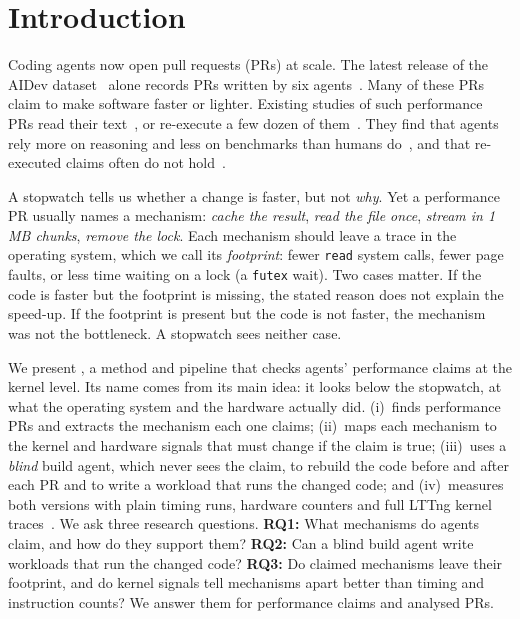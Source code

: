 \section{Introduction}
\label{sec:intro}

Coding agents now open pull requests (PRs) at scale. The latest release of
the AIDev dataset~\cite{li2026aidev} alone records \nAllPRs PRs written by
six agents~\cite{aidev2026v5}. Many of these PRs claim to make software
faster or lighter. Existing studies of such performance PRs read their
text~\cite{opu2025bertopic,peng2025optimization,
dovhoshliubnyi2026mutation,peng2026validation}, or re-execute a few dozen
of them~\cite{qi2026merged}. They find that agents rely more on reasoning
and less on benchmarks than humans do~\cite{peng2026validation}, and that
re-executed claims often do not hold~\cite{qi2026merged}.

A stopwatch tells us whether a change is faster, but not \emph{why}. Yet a
performance PR usually names a mechanism: \emph{cache the result},
\emph{read the file once}, \emph{stream in 1\,MB chunks}, \emph{remove the
lock}. Each mechanism should leave a trace in the operating system, which
we call its \emph{footprint}: fewer \texttt{read} system calls, fewer page
faults, or less time waiting on a lock (a \texttt{futex} wait). Two cases
matter. If the code is faster but the footprint is missing, the stated
reason does not explain the speed-up. If the footprint is present but the
code is not faster, the mechanism was not the bottleneck. A stopwatch sees
neither case.

We present \sys, a method and pipeline that checks agents' performance
claims at the kernel level. Its name comes from its main idea: it looks
below the stopwatch, at what the operating system and the hardware
actually did. \sys (i)~finds performance PRs and extracts the
mechanism each one claims; (ii)~maps each mechanism to the kernel and
hardware signals that must change if the claim is true; (iii)~uses a
\emph{blind} build agent, which never sees the claim, to rebuild the code
before and after each PR and to write a workload that runs the changed
code; and (iv)~measures both versions with plain timing runs, hardware
counters and full LTTng kernel traces~\cite{desnoyers2006lttng}. We ask
three research questions.
\textbf{RQ1:} What mechanisms do agents claim, and how do they support
them? \textbf{RQ2:} Can a blind build agent write workloads that run the
changed code? \textbf{RQ3:} Do claimed mechanisms leave their footprint,
and do kernel signals tell mechanisms apart better than timing and
instruction counts? We answer them for \nClaims performance claims and
\nAnalysed analysed PRs.
